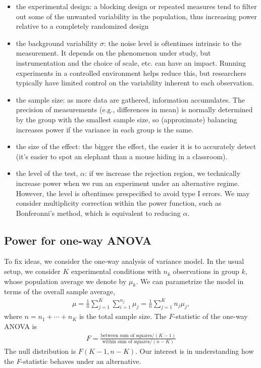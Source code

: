 \documentclass[
  11pt,
  letterpaper,
]{scrbook}
\providecommand{\tightlist}{%
  \setlength{\itemsep}{0pt}\setlength{\parskip}{0pt}}\usepackage{longtable,booktabs,array}
\theoremstyle{definition}
\theoremstyle{definition}
\theoremstyle{remark}
\begin{document}
\begin{itemize}
\tightlist
\item
  the experimental design: a blocking design or repeated measures tend
  to filter out some of the unwanted variability in the population, thus
  increasing power relative to a completely randomized design
\item
  the background variability \(\sigma\): the noise level is oftentimes
  intrinsic to the measurement. It depends on the phenomenon under
  study, but instrumentation and the choice of scale, etc. can have an
  impact. Running experiments in a controlled environment helps reduce
  this, but researchers typically have limited control on the
  variability inherent to each observation.
\item
  the sample size: as more data are gathered, information accumulates.
  The precision of measurements (e.g., differences in mean) is normally
  determined by the group with the smallest sample size, so
  (approximate) balancing increases power if the variance in each group
  is the same.
\item
  the size of the effect: the bigger the effect, the easier it is to
  accurately detect (it's easier to spot an elephant than a mouse hiding
  in a classroom).
\item
  the level of the test, \(\alpha\): if we increase the rejection
  region, we technically increase power when we run an experiment under
  an alternative regime. However, the level is oftentimes prespecified
  to avoid type I errors. We may consider multiplicity correction within
  the power function, such as Bonferonni's method, which is equivalent
  to reducing \(\alpha\).
\end{itemize}

\subsection{Power for one-way ANOVA}\label{sec-power-oneway}

To fix ideas, we consider the one-way analysis of variance model. In the
usual setup, we consider \(K\) experimental conditions with \(n_k\)
observations in group \(k\), whose population average we denote by
\(\mu_k\). We can parametrize the model in terms of the overall sample
average, \begin{align*}
\mu = \frac{1}{n}\sum_{j=1}^K\sum_{i=1}^{n_j} \mu_j = \frac{1}{n}\sum_{j=1}^K n_j \mu_j,
\end{align*} where \(n=n_1 + \cdots +n_K\) is the total sample size. The
\(F\)-statistic of the one-way ANOVA is \begin{align*}
F =  \frac{\text{between sum of squares}/(K-1)}{\text{within sum of squares}/(n-K)}
\end{align*} The null distribution is \(F(K-1, n-K)\). Our interest is
in understanding how the \emph{F}-statistic behaves under an
alternative.
\end{document}
